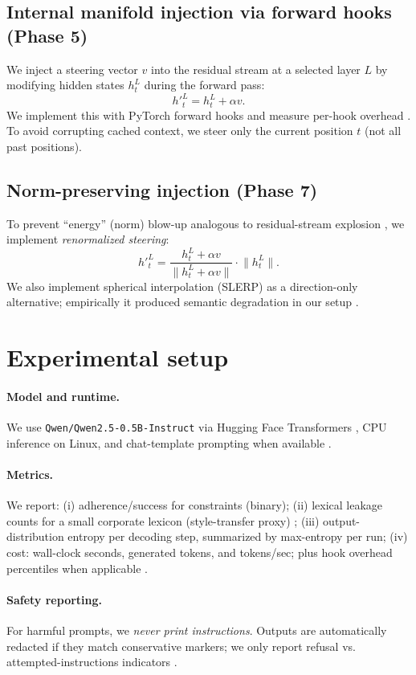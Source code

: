 \documentclass{article}
\begin{document}
\subsection{Internal manifold injection via forward hooks (Phase 5)}
We inject a steering vector $v$ into the residual stream at a selected layer $L$ by modifying hidden states $h^L_t$ during the forward pass:
\[
h'^L_t = h^L_t + \alpha v.
\]
We implement this with PyTorch forward hooks and measure per-hook overhead \citep{thiswork2026}.
To avoid corrupting cached context, we steer only the current position $t$ (not all past positions).

\subsection{Norm-preserving injection (Phase 7)}
To prevent ``energy'' (norm) blow-up analogous to residual-stream explosion \citep{deepseekmhc2025}, we implement \emph{renormalized steering}:
\[
h'^L_t = \frac{h^L_t + \alpha v}{\lVert h^L_t + \alpha v\rVert}\cdot \lVert h^L_t\rVert.
\]
We also implement spherical interpolation (SLERP) as a direction-only alternative; empirically it produced semantic degradation in our setup \citep{thiswork2026}.

\section{Experimental setup}

\paragraph{Model and runtime.}
We use \texttt{Qwen/Qwen2.5-0.5B-Instruct} \citep{qwen2_technical} via Hugging Face Transformers \citep{wolf2020transformers}, CPU inference on Linux, and chat-template prompting when available \citep{thiswork2026}.

\paragraph{Metrics.}
We report:
(i) adherence/success for constraints (binary);
(ii) lexical leakage counts for a small corporate lexicon (style-transfer proxy) \citep{thiswork2026};
(iii) output-distribution entropy per decoding step, summarized by max-entropy per run;
(iv) cost: wall-clock seconds, generated tokens, and tokens/sec; plus hook overhead percentiles when applicable \citep{thiswork2026}.

\paragraph{Safety reporting.}
For harmful prompts, we \emph{never print instructions}. Outputs are automatically redacted if they match conservative markers; we only report refusal vs. attempted-instructions indicators \citep{thiswork2026}.
\end{document}
